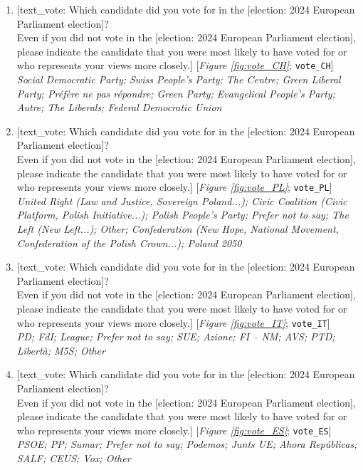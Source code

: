 \begin{enumerate}[resume]
\item  \label{q:vote_CH} [text\_vote: Which candidate did you vote for in the [election: 2024 European Parliament election]?\\Even if you did not vote in the [election: 2024 European Parliament election], please indicate the candidate that you were most likely to have voted for or who represents your views more closely.] [\textit{Figure \ref{fig:vote_CH}}; 
\verb|vote_CH|]
  \\ \textit{Social Democratic Party; Swiss People's Party; The Centre; Green Liberal Party; Préfère ne pas répondre; Green Party; Evangelical People's Party; Autre; The Liberals; Federal Democratic Union}

\item  \label{q:vote_PL} [text\_vote: Which candidate did you vote for in the [election: 2024 European Parliament election]?\\Even if you did not vote in the [election: 2024 European Parliament election], please indicate the candidate that you were most likely to have voted for or who represents your views more closely.] [\textit{Figure \ref{fig:vote_PL}}; 
\verb|vote_PL|]
  \\ \textit{United Right (Law and Justice, Sovereign Poland...); Civic Coalition (Civic Platform, Polish Initiative...); Polish People's Party; Prefer not to say; The Left (New Left...); Other; Confederation (New Hope, National Movement, Confederation of the Polish Crown...); Poland 2050}

\item  \label{q:vote_IT} [text\_vote: Which candidate did you vote for in the [election: 2024 European Parliament election]?\\Even if you did not vote in the [election: 2024 European Parliament election], please indicate the candidate that you were most likely to have voted for or who represents your views more closely.] [\textit{Figure \ref{fig:vote_IT}}; 
\verb|vote_IT|]
  \\ \textit{PD; FdI; League; Prefer not to say; SUE; Azione; FI – NM; AVS; PTD; Libertà; M5S; Other}

\item  \label{q:vote_ES} [text\_vote: Which candidate did you vote for in the [election: 2024 European Parliament election]?\\Even if you did not vote in the [election: 2024 European Parliament election], please indicate the candidate that you were most likely to have voted for or who represents your views more closely.] [\textit{Figure \ref{fig:vote_ES}}; 
\verb|vote_ES|]
  \\ \textit{PSOE; PP; Sumar; Prefer not to say; Podemos; Junts UE; Ahora Repúblicas; SALF; CEUS; Vox; Other}


\end{enumerate}
